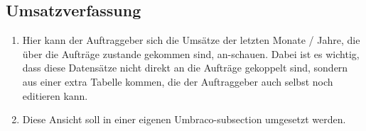 \subsection{Umsatzverfassung}
\begin{enumerate}
	\item Hier kann der Auftraggeber sich die Umsätze der letzten Monate / Jahre, die über die Aufträge zustande gekommen sind, an-schauen. Dabei ist es wichtig, dass diese Datensätze nicht direkt an die Aufträge gekoppelt sind, sondern aus einer extra Tabelle kommen, die der Auftraggeber auch selbst noch editieren kann.
	\item Diese Ansicht soll in einer eigenen Umbraco-subsection umgesetzt werden.
\end{enumerate} 



